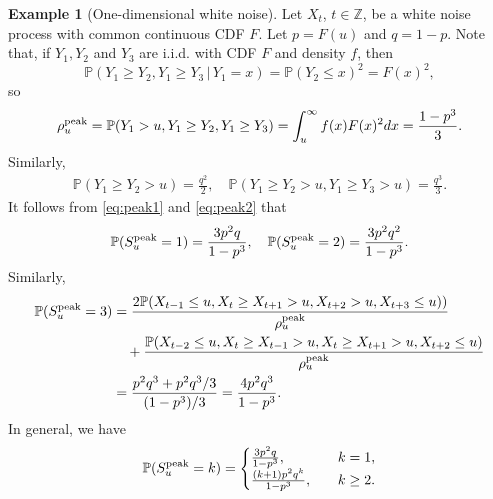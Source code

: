 \documentclass[aap,preprint]{imsart}
\theoremstyle{plain}
\theoremstyle{definition}
\newtheorem{example}[theorem]{Example}
\def\P{{\mathbb P}}
\def\Z{{\mathbb Z}}
\begin{document}
	\begin{example}[One-dimensional white noise]
		\label{example:peak-GWN} 
		Let $X_t$, $t\in \Z$, be a white noise process with common continuous CDF $F$. Let $p=F(u)$ and $q=1-p$. Note that, if $Y_1, Y_2$ and $Y_3$ are i.i.d. with CDF $F$ and density $f$, then 
		\[
		\P(Y_1\ge Y_2, Y_1\ge Y_3 \, | \, Y_1=x) = \P(Y_2\le x)^2 = F(x)^2, 
		\]
		so
		\[
		\rho_u^{\rm peak} = \P(Y_1>u, Y_1\ge Y_2, Y_1\ge Y_3) = \int_u^\infty f(x)F(x)^2dx = \frac{1-p^3}{3}.
		\]
		Similarly,
		\begin{equation*}
			\begin{split}
				\P(Y_1\ge Y_2>u) = \frac{q^2}{2},\quad
				\P(Y_1\ge Y_2>u, Y_1\ge Y_3>u) =\frac{q^3}{3}.
			\end{split}
		\end{equation*}
		It follows from \eqref{eq:peak1} and \eqref{eq:peak2} that
		\begin{equation*}
			\begin{split}
				\P(S_u^{\rm peak}=1) = \frac{3p^2q}{1-p^3},\quad
				\P(S_u^{\rm peak}=2) = \frac{3p^2q^2}{1-p^3}.
			\end{split}
		\end{equation*}
		Similarly, 
		\begin{equation*}
			\begin{split}
				\P(S_u^{\rm peak}=3) &= \frac{2\P(X_{t-1}\le u, X_t\ge X_{t+1}>u, X_{t+2}>u, X_{t+3}\le u))}{\rho_u^{\rm peak}}\\
				&\quad + \frac{\P(X_{t-2}\le u, X_t\ge X_{t-1}> u, X_t\ge X_{t+1}>u, X_{t+2}\le u)}{\rho_u^{\rm peak}}\\
				&= \frac{p^2q^3 + p^2q^3/3}{(1-p^3)/3} = \frac{4p^2q^3}{1-p^3}.
			\end{split}
		\end{equation*}
		In general, we have
		\begin{equation}\label{eq:peak-GWN-1D}
			\P(S_u^{\rm peak}=k) = \begin{cases}
				\frac{3p^2q}{1-p^3}, \quad  &k=1,\\
				\frac{(k+1)p^2q^k}{1-p^3}, \quad  &k\ge 2.
			\end{cases}
		\end{equation}
	\end{example}
	
\end{document}
